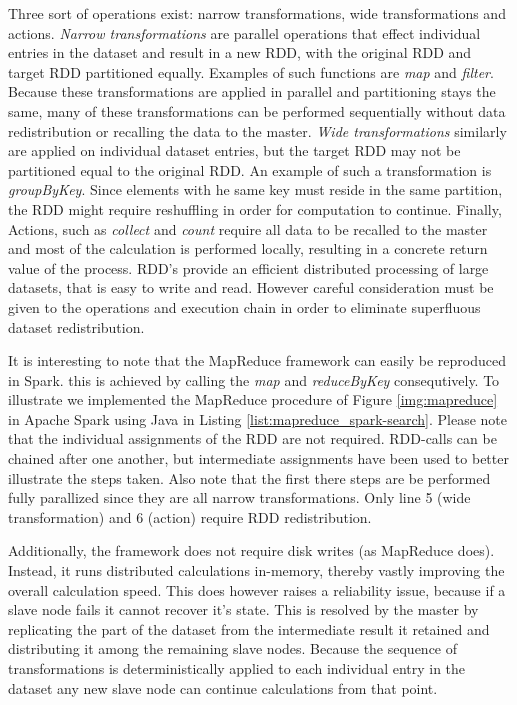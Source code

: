 Three sort of operations exist: narrow transformations, wide transformations and actions. \emph{Narrow transformations} are parallel operations that effect individual entries in the dataset and result in a new RDD, with the original RDD and target RDD partitioned equally. Examples of such functions are \emph{map} and \emph{filter}. Because these transformations are applied in parallel and partitioning stays the same, many of these transformations can be performed sequentially without data redistribution or recalling the data to the master. \emph{Wide transformations} similarly are applied on individual dataset entries, but the target RDD may not be partitioned equal to the original RDD. An example of such a transformation is \emph{groupByKey}. Since elements with  he same key must reside in the same partition, the RDD might require reshuffling in order for computation to continue. Finally, Actions, such as \emph{collect} and \emph{count} require all data to be recalled to the master and most of the calculation is performed locally, resulting in a concrete return value of the process. RDD's provide an efficient distributed processing of large datasets, that is easy to write and read. However careful consideration must be given to the operations and execution chain in order to eliminate superfluous dataset redistribution.



It is interesting to note that the MapReduce framework can easily be reproduced in Spark. this is achieved by calling the \emph{map} and \emph{reduceByKey} consequtively. To illustrate we implemented the MapReduce procedure of Figure \ref{img:mapreduce} in Apache Spark using Java in Listing \ref{list:mapreduce_spark-search}. Please note that the individual assignments of the RDD are not required. RDD-calls can be chained after one another, but intermediate assignments have been used to better illustrate the steps taken. Also note that the first there steps are be performed fully parallized since they are all narrow transformations. Only line 5 (wide transformation) and 6 (action) require RDD redistribution.\cite{web:user_manual}

Additionally, the framework does not require disk writes (as MapReduce does). Instead, it runs distributed calculations in-memory, thereby vastly improving the overall calculation speed. This does however raises a reliability issue, because if a slave node fails it cannot recover it's state. This is resolved by the master by replicating the part of the dataset from the intermediate result it retained and distributing it among the remaining slave nodes. Because the sequence of transformations is deterministically applied to each individual entry in the dataset any new slave node can continue calculations from that point.\cite{web:fault_tolerance}

